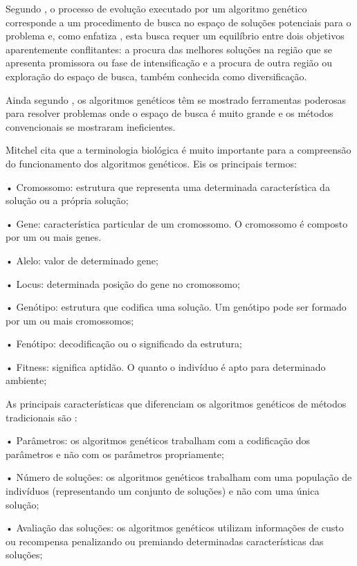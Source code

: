 Segundo \cite{oliveira2005algoritmo}, o processo de evolução executado por um algoritmo genético corresponde a um procedimento de busca no espaço de soluções potenciais para o problema e, como enfatiza \cite{michalewicz1996evolutionary}, esta busca requer um equilíbrio entre dois objetivos aparentemente conflitantes: a procura das melhores soluções na região que se apresenta promissora ou fase de intensificação e a procura de outra região ou exploração do espaço de busca, também conhecida como diversificação.\par
Ainda segundo \cite{oliveira2005algoritmo}, os algoritmos genéticos têm se mostrado ferramentas poderosas para resolver problemas onde o espaço de busca é muito grande e os métodos convencionais se mostraram ineficientes.\par

Mitchel \cite{mitchell1998introduction} cita que a terminologia biológica é muito importante para a compreensão do funcionamento dos algoritmos genéticos. Eis os principais termos: \par
•  Cromossomo: estrutura que representa uma determinada característica da solução ou a própria solução; \par
•  Gene: característica particular de um cromossomo. O cromossomo é composto por um ou mais genes. \par
•  Alelo: valor de determinado gene;\par
•  Locus: determinada posição do gene no cromossomo;\par
•  Genótipo: estrutura que codifica uma solução. Um genótipo pode ser formado por um ou mais cromossomos; \par
•  Fenótipo: decodificação ou o significado da estrutura; \par
•  Fitness: significa aptidão. O quanto o indivíduo é apto para determinado ambiente; \par
As principais características que diferenciam os algoritmos genéticos de métodos tradicionais são \cite{goldberg1989genetic}: \par
•  Parâmetros: os algoritmos genéticos trabalham com a codificação dos parâmetros e não com os parâmetros propriamente; \par
•  Número de soluções: os algoritmos genéticos trabalham com uma população de indivíduos (representando um conjunto de soluções) e não com uma única solução; \par

•  Avaliação das soluções: os algoritmos genéticos utilizam informações de custo ou recompensa penalizando ou premiando determinadas características das soluções; \par

